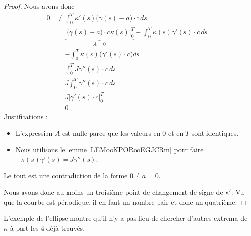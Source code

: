 \begin{proof}
    Nous avons donc
    \begin{subequations}
        \begin{align}
            0&\neq \int_0^T\kappa'(s)\big( \gamma(s)-a \big)\cdot c\,ds\\
            &=\underbrace{\Big[ \big( \gamma(s)-a \big)\cdot c\kappa(s) \Big]_0^{T}}_{A=0}-\int_0^T\kappa(s)\gamma'(s)\cdot c\,ds\\
            &=-\int_0^T\kappa(s)\big( \gamma'(s)\cdot c \big)ds\\
            &=\int_0^TJ\gamma''(s)\cdot c\,ds\\
            &=J\int_0^T\gamma''(s)\cdot c\,ds\\
            &=J\big[ \gamma'(s)\cdot c \big]_0^T\\
            &=0.
        \end{align}
    \end{subequations}
    Justifications :
    \begin{itemize}
        \item 
    L'expression \( A\) est nulle parce que les valeurs en \( 0\) et en \( T\) sont identiques. 
        \item
            Nous utilisons le lemme \ref{LEMooKPORooEGJCRm} pour faire \( -\kappa(s)\gamma'(s)=J\gamma''(s)\).
    \end{itemize}
    Le tout est une contradiction de la forme \( 0\neq a=0\).

    Nous avons donc au moins un troisième point de changement de signe de \( \kappa'\). Vu que la courbe est périodique, il en faut un nombre pair et donc un quatrième.
\end{proof}

L'exemple de l'ellipse montre qu'il n'y a pas lieu de chercher d'autres extrema de \( \kappa\) à part les \( 4\) déjà trouvés.

